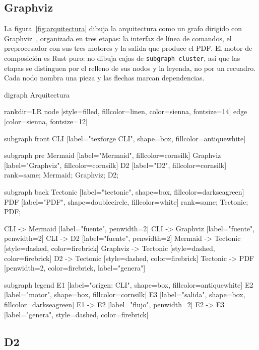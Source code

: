 \subsection{Graphviz}

La figura~\ref{fig:arquitectura} dibuja la arquitectura como un grafo
dirigido con Graphviz~\cite{graphviz}, organizada en tres etapas: la interfaz
de línea de comandos, el preprocesador con sus tres motores y la salida que
produce el PDF. El motor de composición es Rust puro: no dibuja cajas de
\texttt{subgraph cluster}, así que las etapas se distinguen por el relleno de
sus nodos y la leyenda, no por un recuadro. Cada nodo nombra una pieza y las
flechas marcan dependencias.

\begin{graphviz}[width=1.0\linewidth, caption={Arquitectura de texforge: interfaz, preprocesador y salida}, label={fig:arquitectura}, pos=H]
  digraph Arquitectura {
    rankdir=LR
    node [style=filled, fillcolor=linen, color=sienna, fontsize=14]
    edge [color=sienna, fontsize=12]

    subgraph front {
      CLI [label="texforge CLI", shape=box, fillcolor=antiquewhite]
    }

    subgraph pre {
      Mermaid [label="Mermaid", fillcolor=cornsilk]
      Graphviz [label="Graphviz", fillcolor=cornsilk]
      D2 [label="D2", fillcolor=cornsilk]
      { rank=same; Mermaid; Graphviz; D2; }
    }

    subgraph back {
      Tectonic [label="tectonic", shape=box, fillcolor=darkseagreen]
      PDF [label="PDF", shape=doublecircle, fillcolor=white]
      { rank=same; Tectonic; PDF; }
    }

    CLI -> Mermaid [label="fuente", penwidth=2]
    CLI -> Graphviz [label="fuente", penwidth=2]
    CLI -> D2 [label="fuente", penwidth=2]
    Mermaid -> Tectonic [style=dashed, color=firebrick]
    Graphviz -> Tectonic [style=dashed, color=firebrick]
    D2 -> Tectonic [style=dashed, color=firebrick]
    Tectonic -> PDF [penwidth=2, color=firebrick, label="genera"]

    subgraph legend {
      E1 [label="origen: CLI", shape=box, fillcolor=antiquewhite]
      E2 [label="motor", shape=box, fillcolor=cornsilk]
      E3 [label="salida", shape=box, fillcolor=darkseagreen]
      E1 -> E2 [label="flujo", penwidth=2]
      E2 -> E3 [label="genera", style=dashed, color=firebrick]
    }
  }
\end{graphviz}
\FloatBarrier

\subsection{D2}

